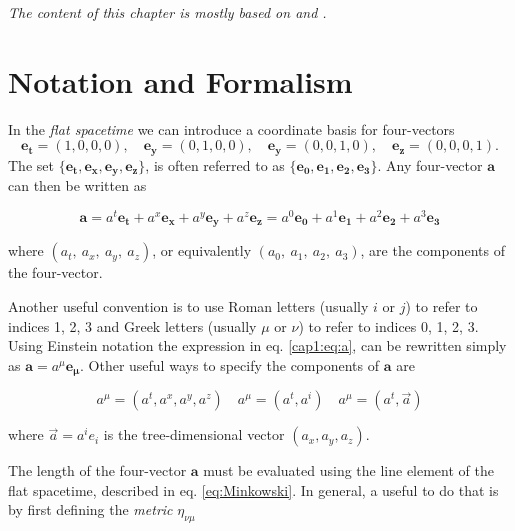 
\textit{The content of this chapter is mostly based on
 and .}


\section{Notation and Formalism}
\label{cap1:ssec:notation}

In the \textit{flat spacetime} we can introduce a coordinate basis for
four-vectors
\begin{equation}
    \mathbf{e_t} = (1,0,0,0), \quad
    \mathbf{e_y} = (0,1,0,0), \quad
    \mathbf{e_y} = (0,0,1,0), \quad
    \mathbf{e_z} = (0,0,0,1).
    \label{cap1:eq:coord_base}
\end{equation}
The set 
$\{ \mathbf{e_t}, \mathbf{e_x}, \mathbf{e_y}, \mathbf{e_z} \}$, is often
referred to as $\{ \mathbf{e_0}, \mathbf{e_1}, \mathbf{e_2}, \mathbf{e_3} \}$.
Any four-vector $\textbf{a}$ can then be written as

\begin{equation}
    \textbf{a}
    = a^t \mathbf{e_t} + a^x \mathbf{e_x} + a^y \mathbf{e_y} + a^z \mathbf{e_z}
    = a^0 \mathbf{e_0} + a^1 \mathbf{e_1} + a^2 \mathbf{e_2} + a^3 \mathbf{e_3}
    \label{cap1:eq:a}
\end{equation}

where $(a_t,~a_x,~a_y,~a_z)$, or equivalently $(a_0,~a_1,~a_2,~a_3)$, are the
components of the four-vector.

Another useful convention is to use Roman letters (usually $i$ or $j$) to refer
to indices 1, 2, 3 and Greek letters (usually $\mu$ or $\nu$) to refer to
indices 0, 1, 2, 3.
Using Einstein notation the expression in eq. \ref{cap1:eq:a}, can be rewritten
simply as $\textbf{a} = a^\mu \mathbf {e_\mu}$.
Other useful ways to specify the components of $\textbf{a}$ are

\begin{equation*}
    a^\mu = (a^t, a^x, a^y, a^z) \quad a^\mu = (a^t, a^i) \quad a^\mu
    = (a^t, \vec a)
\end{equation*}

where $\vec a = a^i e_i$ is the tree-dimensional vector $(a_x, a_y, a_z)$.

The length of the four-vector $\mathbf{a}$ must be evaluated using the line
element of the flat spacetime, described in eq. \ref{eq:Minkowski}.
In general, a useful to do that is by first defining the \textit{metric}
$\eta_{\nu \mu}$

